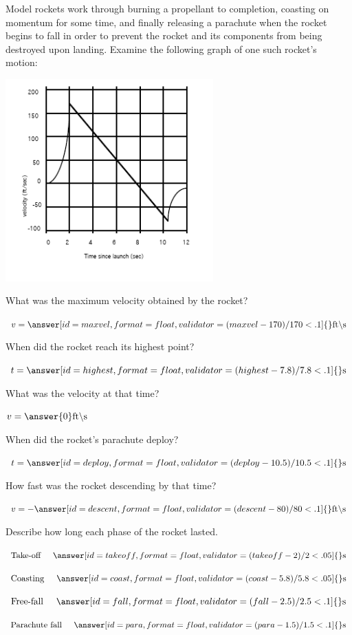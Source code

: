 \documentclass{ximera}
\begin{document}
\begin{question}
Model rockets work through burning a propellant to completion, coasting on momentum for some time, and finally releasing a parachute when the rocket begins to fall in order to prevent the rocket and its components from being destroyed upon landing. Examine the following graph of one such rocket's motion:
\begin{image}
    \includegraphics[width=80mm]{rocket.png}
\end{image}

What was the maximum velocity obtained by the rocket?

$v = \answer[id=maxvel,format=float,validator=(maxvel-170)/170 < .1]{} \text{ft}\backslash \text{s}$

When did the rocket reach its highest point?

$t = \answer[id=highest,format=float,validator=(highest-7.8)/7.8 < .1]{} \text{s}$

What was the velocity at that time?

$v = \answer{0} \text{ft} \backslash \text{s}$

When did the rocket's parachute deploy?

$t = \answer[id=deploy,format=float,validator=(deploy-10.5)/10.5 < .1]{} \text{s}$

How fast was the rocket descending by that time?

$v = -\answer[id=descent,format=float,validator=(descent-80)/80 < .1]{} \text{ft} \backslash \text{s}$

Describe how long each phase of the rocket lasted.

$\text{Take-off} \hspace{5mm} \answer[id=takeoff,format=float,validator=(takeoff-2)/2 < .05]{} \text{s}$

$\text{Coasting} \hspace{5mm} \answer[id=coast,format=float,validator=(coast-5.8)/5.8 < .05]{} \text{s}$

$\text{Free-fall} \hspace{5mm} \answer[id=fall,format=float,validator=(fall-2.5)/2.5 < .1]{} \text{s}$

$\text{Parachute fall} \hspace{5mm} \answer[id=para,format=float,validator=(para-1.5)/1.5 < .1]{} \text{s}$
\end{question}
\end{document}
